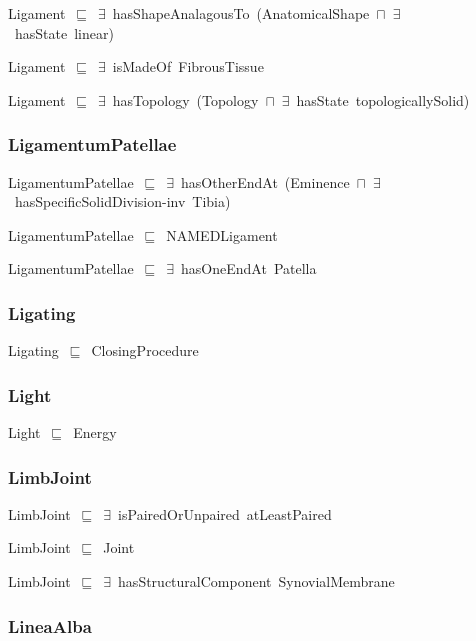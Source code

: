 \documentclass{article}
\begin{document}
Ligament~\ensuremath{\sqsubseteq}~\ensuremath{\exists}~hasShapeAnalagousTo~(AnatomicalShape~\ensuremath{\sqcap}~\ensuremath{\exists}~hasState~linear)~

Ligament~\ensuremath{\sqsubseteq}~\ensuremath{\exists}~isMadeOf~FibrousTissue~

Ligament~\ensuremath{\sqsubseteq}~\ensuremath{\exists}~hasTopology~(Topology~\ensuremath{\sqcap}~\ensuremath{\exists}~hasState~topologicallySolid)~

\subsubsection*{LigamentumPatellae}

LigamentumPatellae~\ensuremath{\sqsubseteq}~\ensuremath{\exists}~hasOtherEndAt~(Eminence~\ensuremath{\sqcap}~\ensuremath{\exists}~hasSpecificSolidDivision-inv~Tibia)~

LigamentumPatellae~\ensuremath{\sqsubseteq}~NAMEDLigament~

LigamentumPatellae~\ensuremath{\sqsubseteq}~\ensuremath{\exists}~hasOneEndAt~Patella~

\subsubsection*{Ligating}

Ligating~\ensuremath{\sqsubseteq}~ClosingProcedure~

\subsubsection*{Light}

Light~\ensuremath{\sqsubseteq}~Energy~

\subsubsection*{LimbJoint}

LimbJoint~\ensuremath{\sqsubseteq}~\ensuremath{\exists}~isPairedOrUnpaired~atLeastPaired~

LimbJoint~\ensuremath{\sqsubseteq}~Joint~

LimbJoint~\ensuremath{\sqsubseteq}~\ensuremath{\exists}~hasStructuralComponent~SynovialMembrane~

\subsubsection*{LineaAlba}
\end{document}
